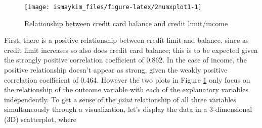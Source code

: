 \documentclass[12pt,]{krantz}
\makeatletter
\newenvironment{Shaded}{\begin{snugshade}}{\end{snugshade}}
\newcommand{\KeywordTok}[1]{\textcolor[rgb]{0.27,0.27,0.27}{\textbf{#1}}}
\newcommand{\DataTypeTok}[1]{\textcolor[rgb]{0.27,0.27,0.27}{#1}}
\newcommand{\StringTok}[1]{\textcolor[rgb]{0.5,0.5,0.5}{#1}}
\newcommand{\OtherTok}[1]{\textcolor[rgb]{0.37,0.37,0.37}{#1}}
\newcommand{\OperatorTok}[1]{\textcolor[rgb]{0.43,0.43,0.43}{\textbf{#1}}}
\newcommand{\NormalTok}[1]{#1}
\newenvironment{kframe}{%
\medskip{}
\setlength{\fboxsep}{.8em}
 \def\at@end@of@kframe{}%
 \ifinner\ifhmode%
  \def\at@end@of@kframe{\end{minipage}}%
  \begin{minipage}{\columnwidth}%
 \fi\fi%
 \def\FrameCommand##1{\hskip\@totalleftmargin \hskip-\fboxsep
 \colorbox{shadecolor}{##1}\hskip-\fboxsep
     \hskip-\linewidth \hskip-\@totalleftmargin \hskip\columnwidth}%
 \MakeFramed {\advance\hsize-\width
   \@totalleftmargin\z@ \linewidth\hsize
   \@setminipage}}%
 {\par\unskip\endMakeFramed%
 \at@end@of@kframe}
\renewenvironment{Shaded}{\begin{kframe}}{\end{kframe}}
\makeatother
\begin{document}
\begin{Shaded}
\end{Shaded}

\begin{figure}

{\centering \texttt{[image: ismaykim\_files/figure-latex/2numxplot1-1]} 

}

\caption{Relationship between credit card balance and credit limit/income}\label{fig:2numxplot1}
\end{figure}

First, there is a positive relationship between credit limit and
balance, since as credit limit increases so also does credit card
balance; this is to be expected given the strongly positive correlation
coefficient of 0.862. In the case of income, the positive relationship
doesn't appear as strong, given the weakly positive correlation
coefficient of 0.464. However the two plots in Figure
\ref{fig:2numxplot1} only focus on the relationship of the outcome
variable with each of the explanatory variables independently. To get a
sense of the \emph{joint} relationship of all three variables
simultaneously through a visualization, let's display the data in a
3-dimensional (3D) scatterplot, where
\end{document}
